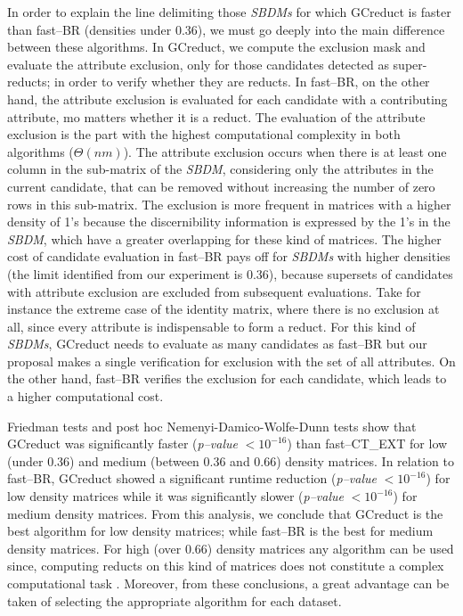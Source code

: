 \documentclass[authoryear,11pt]{elsarticle}
\begin{document}
  In order to explain the line delimiting those \textit{SBDMs} for which GCreduct is faster than fast--BR (densities under 0.36), we must go deeply into the main difference between these algorithms. In GCreduct, we compute the exclusion mask and evaluate the attribute exclusion, only for those candidates detected as super-reducts; in order to verify whether they are reducts. In fast--BR, on the other hand, the attribute exclusion is evaluated for each candidate with a contributing attribute, mo matters whether it is a reduct. The evaluation of the attribute exclusion is the part with the highest computational complexity in both algorithms ($\Theta (nm)$). The attribute exclusion occurs when there is at least one column in the sub-matrix of the \textit{SBDM}, considering only the attributes in the current candidate, that can be removed without increasing the number of zero rows in this sub-matrix. The exclusion is more frequent in matrices with a higher density of 1's because the discernibility information is expressed by the 1's in the \textit{SBDM}, which have a greater overlapping for these kind of matrices. The higher cost of candidate evaluation in fast--BR pays off for \textit{SBDMs} with higher densities (the limit identified from our experiment is 0.36), because supersets of candidates with attribute exclusion are excluded from subsequent evaluations. Take for instance the extreme case of the identity matrix, where there is no exclusion at all, since every attribute is indispensable to form a reduct. For this kind of \textit{SBDMs}, GCreduct needs to evaluate as many candidates as fast--BR but our proposal makes a single verification for exclusion with the set of all attributes. On the other hand, fast--BR verifies the exclusion for each candidate, which leads to a higher computational cost.

  Friedman tests and post hoc Nemenyi-Damico-Wolfe-Dunn tests show that GCreduct was significantly faster (\textit{p--value} $< 10^{-16}$) than fast--CT\_EXT for low (under 0.36) and medium (between 0.36 and 0.66) density matrices. In relation to fast--BR, GCreduct showed a significant runtime reduction (\textit{p--value} $< 10^{-16}$) for low density matrices while it was significantly slower (\textit{p--value} $< 10^{-16}$) for medium density matrices. From this analysis, we conclude that GCreduct is the best algorithm for low density matrices; while fast--BR is the best for medium density matrices. For high (over 0.66) density matrices any algorithm can be used since, computing reducts on this kind of matrices does not constitute a complex computational task \citep{Rojas12}. Moreover, from these conclusions, a great advantage can be taken of selecting the appropriate algorithm for each dataset. 
\end{document}
